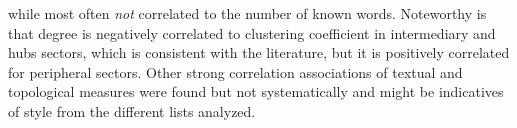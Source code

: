 																																																																																																																																																																																																																																																																																																																																																																																																				while most often \emph{not} correlated to the number of known words.
																																																																																																																																																																																																																																																																																																																																																																																																				Noteworthy is that degree is negatively correlated to clustering coefficient in intermediary and hubs sectors,
																																																																																																																																																																																																																																																																																																																																																																																																				which is consistent with the literature, but it is positively correlated for
																																																																																																																																																																																																																																																																																																																																																																																																				peripheral sectors.
																																																																																																																																																																																																																																																																																																																																																																																																				Other strong correlation associations of textual and topological measures were found
																																																																																																																																																																																																																																																																																																																																																																																																				but not systematically and might be indicatives of style from the different lists analyzed.
